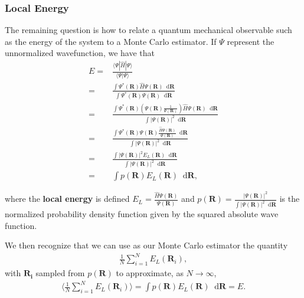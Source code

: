 \documentclass[twoside,english]{uiofysmaster}
\newcommand*\dif{\mathop{}\!\mathrm{d}}
\begin{document}
\subsubsection{Local Energy}

The remaining question is how to relate a quantum mechanical observable such as the energy of the system to a Monte Carlo estimator. If $\Psi$ represent the unnormalized wavefunction, we have that \cite{Toulouse2016}
\begin{align}
	E =& \frac{\langle \Psi | \hat{H} | \Psi \rangle}{\langle \Psi | \Psi \rangle}  \\
	=& \frac{ \int \Psi^\ast (\bm{R}) \hat{H} \Psi(\bm{R}) \dif \bm{R} }
	{\int \Psi^\ast (\bm{R})  \Psi(\bm{R}) \dif \bm{R}} \\
	=& \frac{ \int \Psi^\ast (\bm{R}) (\Psi(\bm{R}) \frac{1}{\Psi(\bm{R})}) \hat{H} \Psi(\bm{R}) \dif \bm{R} }
	{\int | \Psi(\bm{R})|^2 \dif \bm{R}} \\
	=&  \frac{ \int \Psi^\ast (\bm{R}) \Psi(\bm{R}) \frac{\hat{H} \Psi(\bm{R}) }{\Psi(\bm{R})}  \dif \bm{R} }
	{\int | \Psi(\bm{R})|^2 \dif \bm{R}} \\
	=&  \frac{ \int | \Psi(\bm{R})|^2  E_L(\bm{R})  \dif \bm{R} }
	{\int | \Psi(\bm{R})|^2 \dif \bm{R}} \\
	=& \int p(\bm{R}) E_L (\bm{R}) \dif \bm{R},
\end{align}

where the \textbf{local energy} is defined $E_L = \frac{\hat{H} \Psi(\bm{R})
}{\Psi(\bm{R})} $ and $p(\bm{R}) = \frac{| \Psi(\bm{R})|^2 }{ \int |
  \Psi(\bm{R})|^2 \dif \bm{R} }$ is the normalized probability density function given
by the squared absolute wave function.

We then recognize that we can use as our Monte Carlo estimator the quantity
\begin{align}
	\frac{1}{N} \sum_{i=1}^N E_L(\bm{R}_i),
\end{align}
with $\bm{R_i}$ sampled from $p(\bm{R})$ to approximate, as $N \rightarrow \infty$, 
\begin{align}
	\langle \frac{1}{N} \sum_{i=1}^N E_L(\bm{R}_i) \rangle = \int p(\bm{R}) E_L(\bm{R}) \dif \bm{R} = E .
\end{align}
\end{document}
